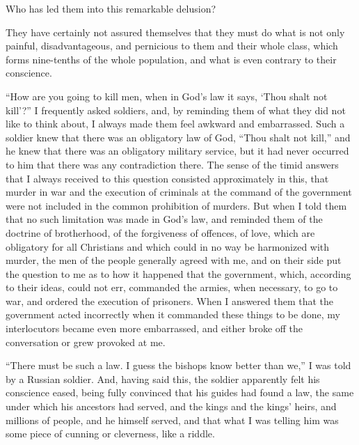 \documentclass{book}
\begin{document}
Who has led them into this remarkable delusion?

They have certainly not assured themselves that they must do what is not only painful, disadvantageous, and pernicious to them and their whole class, which forms nine-tenths of the whole population, and what is even contrary to their conscience.

“How are you going to kill men, when in God’s law it says, ‘Thou shalt not kill’?” I frequently asked soldiers, and, by reminding them of what they did not like to think about, I always made them feel awkward and embarrassed. Such a soldier knew that there was an obligatory law of God, “Thou shalt not kill,” and he knew that there was an obligatory military service, but it had never occurred to him that there was any contradiction there. The sense of the timid answers that I always received to this question consisted approximately in this, that murder in war and the execution of criminals at the command of the government were not included in the common prohibition of murders. But when I told them that no such limitation was made in God’s law, and reminded them of the doctrine of brotherhood, of the forgiveness of offences, of love, which are obligatory for all Christians and which could in no way be harmonized with murder, the men of the people generally agreed with me, and on their side put the question to me as to how it happened that the government, which, according to their ideas, could not err, commanded the armies, when necessary, to go to war, and ordered the execution of prisoners. When I answered them that the government acted incorrectly when it commanded these things to be done, my interlocutors became even more embarrassed, and either broke off the conversation or grew provoked at me.

“There must be such a law. I guess the bishops know better than we,” I was told by a Russian soldier. And, having said this, the soldier apparently felt his conscience eased, being fully convinced that his guides had found a law, the same under which his ancestors had served, and the kings and the kings’ heirs, and millions of people, and he himself served, and that what I was telling him was some piece of cunning or cleverness, like a riddle.
\end{document}
